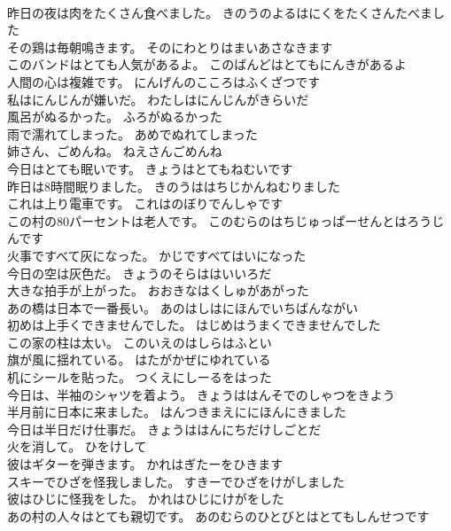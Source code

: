 \documentclass[8pt]{extreport}
\begin{document}
\begin{CJK}{UTF8}{min}
\\	昨日の夜は肉をたくさん食べました。	きのうのよるはにくをたくさんたべました 
\\	その鶏は毎朝鳴きます。	そのにわとりはまいあさなきます 
\\	このバンドはとても人気があるよ。	このばんどはとてもにんきがあるよ 
\\	人間の心は複雑です。	にんげんのこころはふくざつです 
\\	私はにんじんが嫌いだ。	わたしはにんじんがきらいだ 
\\	風呂がぬるかった。	ふろがぬるかった 
\\	雨で濡れてしまった。	あめでぬれてしまった 
\\	姉さん、ごめんね。	ねえさんごめんね 
\\	今日はとても眠いです。	きょうはとてもねむいです 
\\	昨日は8時間眠りました。	きのうははちじかんねむりました 
\\	これは上り電車です。	これはのぼりでんしゃです 
\\	この村の80パーセントは老人です。	このむらのはちじゅっぱーせんとはろうじんです 
\\	火事ですべて灰になった。	かじですべてはいになった 
\\	今日の空は灰色だ。	きょうのそらははいいろだ 
\\	大きな拍手が上がった。	おおきなはくしゅがあがった 
\\	あの橋は日本で一番長い。	あのはしはにほんでいちばんながい 
\\	初めは上手くできませんでした。	はじめはうまくできませんでした 
\\	この家の柱は太い。	このいえのはしらはふとい 
\\	旗が風に揺れている。	はたがかぜにゆれている 
\\	机にシールを貼った。	つくえにしーるをはった 
\\	今日は、半袖のシャツを着よう。	きょうははんそでのしゃつをきよう 
\\	半月前に日本に来ました。	はんつきまえににほんにきました 
\\	今日は半日だけ仕事だ。	きょうははんにちだけしごとだ 
\\	火を消して。	ひをけして 
\\	彼はギターを弾きます。	かれはぎたーをひきます 
\\	スキーでひざを怪我しました。	すきーでひざをけがしました 
\\	彼はひじに怪我をした。	かれはひじにけがをした 
\\	あの村の人々はとても親切です。	あのむらのひとびとはとてもしんせつです 

\end{CJK}
\end{document}
